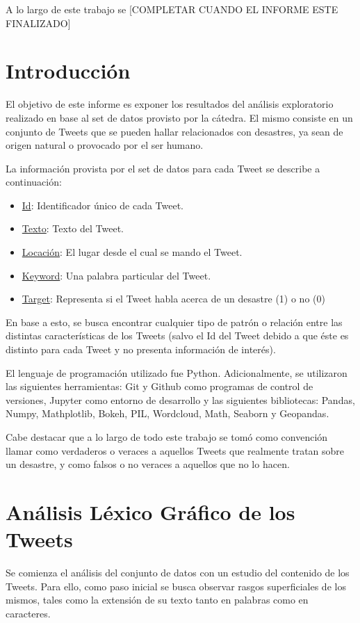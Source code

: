 \documentclass[titlepage,a4paper]{article}
\begin{document}
A lo largo de este trabajo se [COMPLETAR CUANDO EL INFORME ESTE FINALIZADO]




\newpage

\section{Introducción}\label{sec:intro}
    El objetivo de este informe  es exponer los resultados del análisis exploratorio realizado en base al set de datos provisto por la cátedra. El mismo consiste en un conjunto de Tweets que se pueden hallar relacionados con desastres, ya sean de origen natural o provocado por el ser humano.
    
    La información provista por el set de datos para cada Tweet se describe a continuación: 
    
    \begin{itemize}
        \item \underline{Id}: Identificador único de cada Tweet.
        \item \underline{Texto}: Texto del Tweet.
        \item \underline{Locación}: El lugar desde el cual se mando el Tweet. 
        \item \underline{Keyword}: Una palabra particular del Tweet.
        \item \underline{Target}: Representa si el Tweet habla acerca de un desastre (1) o no (0)
    \end{itemize}
 
    En base a esto, se busca encontrar cualquier tipo de patrón o relación entre las distintas características de los Tweets (salvo el Id del Tweet debido a que éste es distinto para cada Tweet y no presenta información de interés).
    
    El lenguaje de programación utilizado fue Python. Adicionalmente, se utilizaron las siguientes herramientas: Git y Github como programas de control de versiones, Jupyter como entorno de desarrollo y las siguientes bibliotecas: Pandas, Numpy, Mathplotlib, Bokeh, PIL, Wordcloud, Math, Seaborn y Geopandas.
    
    Cabe destacar que a lo largo de todo este trabajo se tomó como convención llamar como verdaderos o veraces a aquellos Tweets que realmente tratan sobre un desastre, y como falsos o no veraces a aquellos que no lo hacen.
    
    
    \newpage
    \section{Análisis Léxico Gráfico de los Tweets}\label{sec:intro}
    Se comienza el análisis del conjunto de datos con un estudio del contenido de los Tweets. Para ello, como paso inicial se busca observar rasgos superficiales de los mismos, tales como la extensión de su texto tanto en palabras como en caracteres.
    
\end{document}
